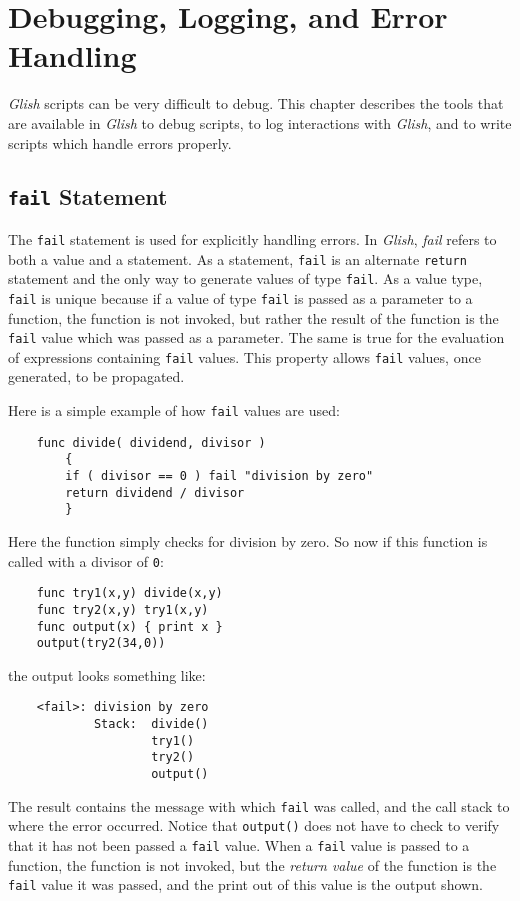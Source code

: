
\chapter{Debugging, Logging, and Error Handling}
\label{debugging-logging-fail}

{\em Glish} scripts can be very difficult to debug. This chapter describes the tools
that are available in {\em Glish} to debug scripts, to log
interactions 
with {\em Glish},
and to write scripts which handle errors properly.

\section{{\tt fail} Statement}
\label{fail-stmt-2}

The {\tt fail} statement is used for explicitly handling 
errors.  In {\em Glish}, {\em fail} refers to both a value and a statement.
As a statement, {\tt fail}
is an alternate {\tt return} statement and  the only way to generate
values of type {\tt fail}.
As a value type, {\tt fail} is unique because if a value of type {\tt fail} is 
passed as a parameter
to a function, the function is not invoked, but rather the result of the function
is the {\tt fail} value which was passed as a parameter. The same is true
for the evaluation of expressions containing {\tt fail} values. This
property allows {\tt fail} values, once generated, to be propagated.

Here is a simple example of how {\tt fail} values are used:
\begin{verbatim}
    func divide( dividend, divisor )
        {
        if ( divisor == 0 ) fail "division by zero"
        return dividend / divisor
        }
\end{verbatim}
Here the function simply checks for division by zero. So now if this function
is called with a divisor of {\tt 0}:
\begin{verbatim}
    func try1(x,y) divide(x,y)
    func try2(x,y) try1(x,y)
    func output(x) { print x }
    output(try2(34,0))
\end{verbatim}
the output looks something like:
\begin{verbatim}
    <fail>: division by zero
            Stack:  divide()
                    try1()
                    try2()
                    output() 
\end{verbatim}
The result contains the message with which {\tt fail} was called, and the call
stack to where the error occurred. Notice that {\tt output()} does not have to
check to verify that it has not been passed a {\tt fail} value. When a {\tt fail}
value is passed to a function, the function is not invoked, but the {\em return value}
of the function is the {\tt fail} value it was passed, and the print out of this value
is the output shown.

